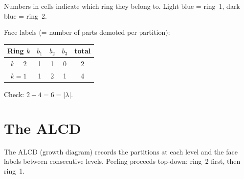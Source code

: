 \documentclass[11pt]{article}
\begin{document}
\noindent
Numbers in cells indicate which ring they belong to.
Light blue = ring~1, dark blue = ring~2.

\medskip\noindent
Face labels (= number of parts demoted per partition):

\smallskip
\begin{center}
\begin{tabular}{c|ccc|c}
Ring $k$ & $b_1$ & $b_2$ & $b_3$ & total \\ \hline
$k=2$ & 1 & 1 & 0 & 2 \\
$k=1$ & 1 & 2 & 1 & 4 \\
\end{tabular}
\end{center}

\noindent
Check: $2 + 4 = 6 = |\lambda|$.



\section{The ALCD}

The ALCD (growth diagram) records the partitions at each
level and the face labels between consecutive levels.
Peeling proceeds top-down: ring~2 first, then ring~1.
\end{document}
